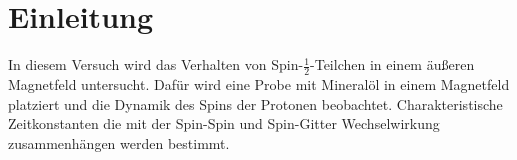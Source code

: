 \section{Einleitung}
In diesem Versuch wird das Verhalten von Spin-$\frac{1}{2}$-Teilchen in einem äußeren Magnetfeld untersucht. Dafür wird eine Probe mit Mineralöl in einem Magnetfeld platziert und die Dynamik des Spins der Protonen beobachtet. Charakteristische Zeitkonstanten die mit der Spin-Spin und Spin-Gitter Wechselwirkung zusammenhängen werden bestimmt.
